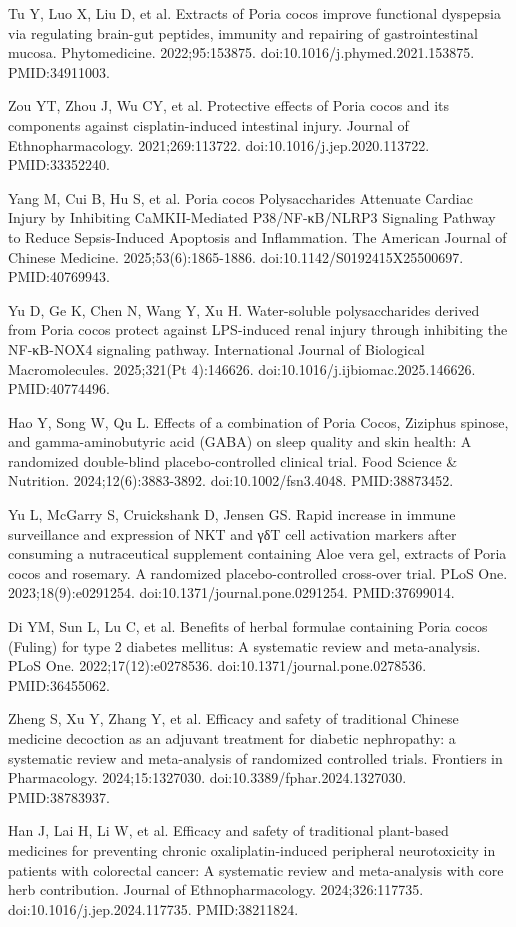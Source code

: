 \documentclass[11pt,oneside]{book}
\newcommand{\reff}[2]{\par\hangindent=7mm\hangafter=1\noindent[#1]\hspace{2mm}#2\par}
\begin{document}
\reff{29}{Tu Y, Luo X, Liu D, et al. Extracts of Poria cocos improve functional dyspepsia via regulating brain-gut peptides, immunity and repairing of gastrointestinal mucosa. Phytomedicine. 2022;95:153875. doi:10.1016/j.phymed.2021.153875. PMID:34911003.}
\reff{30}{Zou YT, Zhou J, Wu CY, et al. Protective effects of Poria cocos and its components against cisplatin-induced intestinal injury. Journal of Ethnopharmacology. 2021;269:113722. doi:10.1016/j.jep.2020.113722. PMID:33352240.}
\reff{31}{Yang M, Cui B, Hu S, et al. Poria cocos Polysaccharides Attenuate Cardiac Injury by Inhibiting CaMKII-Mediated P38/NF-κB/NLRP3 Signaling Pathway to Reduce Sepsis-Induced Apoptosis and Inflammation. The American Journal of Chinese Medicine. 2025;53(6):1865-1886. doi:10.1142/S0192415X25500697. PMID:40769943.}
\reff{32}{Yu D, Ge K, Chen N, Wang Y, Xu H. Water-soluble polysaccharides derived from Poria cocos protect against LPS-induced renal injury through inhibiting the NF-κB-NOX4 signaling pathway. International Journal of Biological Macromolecules. 2025;321(Pt 4):146626. doi:10.1016/j.ijbiomac.2025.146626. PMID:40774496.}
\reff{33}{Hao Y, Song W, Qu L. Effects of a combination of Poria Cocos, Ziziphus spinose, and gamma-aminobutyric acid (GABA) on sleep quality and skin health: A randomized double-blind placebo-controlled clinical trial. Food Science \& Nutrition. 2024;12(6):3883-3892. doi:10.1002/fsn3.4048. PMID:38873452.}
\reff{34}{Yu L, McGarry S, Cruickshank D, Jensen GS. Rapid increase in immune surveillance and expression of NKT and γδT cell activation markers after consuming a nutraceutical supplement containing Aloe vera gel, extracts of Poria cocos and rosemary. A randomized placebo-controlled cross-over trial. PLoS One. 2023;18(9):e0291254. doi:10.1371/journal.pone.0291254. PMID:37699014.}
\reff{35}{Di YM, Sun L, Lu C, et al. Benefits of herbal formulae containing Poria cocos (Fuling) for type 2 diabetes mellitus: A systematic review and meta-analysis. PLoS One. 2022;17(12):e0278536. doi:10.1371/journal.pone.0278536. PMID:36455062.}
\reff{36}{Zheng S, Xu Y, Zhang Y, et al. Efficacy and safety of traditional Chinese medicine decoction as an adjuvant treatment for diabetic nephropathy: a systematic review and meta-analysis of randomized controlled trials. Frontiers in Pharmacology. 2024;15:1327030. doi:10.3389/fphar.2024.1327030. PMID:38783937.}
\reff{37}{Han J, Lai H, Li W, et al. Efficacy and safety of traditional plant-based medicines for preventing chronic oxaliplatin-induced peripheral neurotoxicity in patients with colorectal cancer: A systematic review and meta-analysis with core herb contribution. Journal of Ethnopharmacology. 2024;326:117735. doi:10.1016/j.jep.2024.117735. PMID:38211824.}
\end{document}
